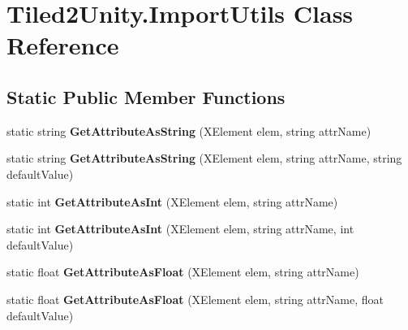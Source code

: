 \hypertarget{class_tiled2_unity_1_1_import_utils}{}\section{Tiled2\+Unity.\+Import\+Utils Class Reference}
\label{class_tiled2_unity_1_1_import_utils}
\subsection*{Static Public Member Functions}
\begin{DoxyCompactItemize}
\item 
\mbox{\label{class_tiled2_unity_1_1_import_utils_a6b9c8d7811ab60c57a1f706dfc4909c3}} 
static string {\bfseries Get\+Attribute\+As\+String} (X\+Element elem, string attr\+Name)
\item 
\mbox{\label{class_tiled2_unity_1_1_import_utils_a963cc485c7518ba85e384b744e1ed552}} 
static string {\bfseries Get\+Attribute\+As\+String} (X\+Element elem, string attr\+Name, string default\+Value)
\item 
\mbox{\label{class_tiled2_unity_1_1_import_utils_a91b971fb856c5458a556dead9022b5b3}} 
static int {\bfseries Get\+Attribute\+As\+Int} (X\+Element elem, string attr\+Name)
\item 
\mbox{\label{class_tiled2_unity_1_1_import_utils_aeef489bd7347636aebc95e1efa4520c4}} 
static int {\bfseries Get\+Attribute\+As\+Int} (X\+Element elem, string attr\+Name, int default\+Value)
\item 
\mbox{\label{class_tiled2_unity_1_1_import_utils_a381761e5855cd4dc534522c0a39158a5}} 
static float {\bfseries Get\+Attribute\+As\+Float} (X\+Element elem, string attr\+Name)
\item 
\mbox{\label{class_tiled2_unity_1_1_import_utils_ac8038d177230fe92c297c4212479f11b}} 
static float {\bfseries Get\+Attribute\+As\+Float} (X\+Element elem, string attr\+Name, float default\+Value)
\item 
\mbox{\label{class_tiled2_unity_1_1_import_utils_ad07d814f168a62de77c6feb055b28fc6}} 

\end{DoxyCompactItemize}
